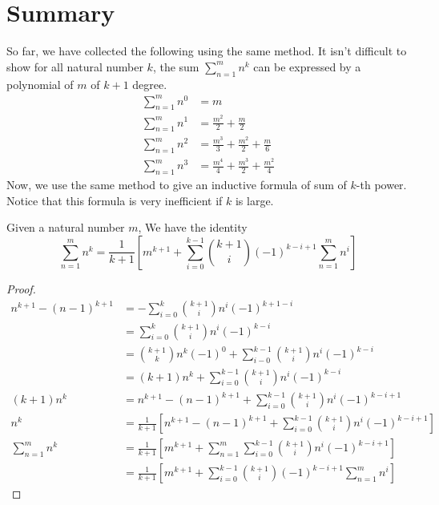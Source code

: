 \documentclass{report}
\begin{document}
\section{Summary}
So far, we have collected the following using the same method. It isn't difficult to show for all natural number $k$, the sum $\sum_{n=1}^{m} n^k$ can be expressed by a polynomial of $m$ of $k+1$ degree.
\begin{align}
  \sum_{n=1}^{m} n^0 &= m\\
  \sum_{n=1}^{m} n^1 &= \frac{m^2}{2}+\frac{m}{2}\\
  \sum_{n=1}^{m} n^2 &= \frac{m^3}{3}+\frac{m^2}{2}+\frac{m}{6}\\
  \sum_{n=1}^{m} n^3 &= \frac{m^4}{4}+\frac{m^3}{2}+\frac{m^2}{4}
\end{align} 
Now, we use the same method to give an inductive formula of sum of $k$-th power. Notice that this formula is very inefficient if $k$ is large.
\begin{theorem}
  Given a natural number $m$, We have the identity 
\begin{equation}
\sum_{n=1}^{m} n^k = \frac{1}{k+1}[m^{k+1}+\sum_{i=0}^{k-1} \binom{k+1}{i}(-1)^{k-i+1}\sum_{n=1}^{m} n^i ]
\end{equation}
\end{theorem}
\begin{proof}
\begin{align}
  n^{k+1}-(n-1)^{k+1}&= -\sum_{i=0}^{k} \binom{k+1}{i}n^i(-1)^{k+1-i}\\
                     &=\sum_{i=0}^{k} \binom{k+1}{i}n^i(-1)^{k-i}\\
                     &= \binom{k+1}{k}n^k(-1)^0+\sum_{i-0}^{k-1} \binom{k+1}{i}n^i(-1)^{k-i}\\
                     &= (k+1)n^k+\sum_{i=0}^{k-1} \binom{k+1}{i}n^i(-1)^{k-i}\\
  (k+1)n^k &= n^{k+1}-(n-1)^{k+1}+\sum_{i=0}^{k-1} \binom{k+1}{i}n^i(-1)^{k-i+1}\\
  n^k &=\frac{1}{k+1}[n^{k+1}-(n-1)^{k+1}+\sum_{i=0}^{k-1} \binom{k+1}{i} n^i(-1)^{k-i+1}]\\
  \sum_{n=1}^{m} n^k&=\frac{1}{k+1}[m^{k+1}+\sum_{n=1}^{m} \sum_{i=0}^{k-1} \binom{k+1}{i}n^i(-1)^{k-i+1}]\\
                    &= \frac{1}{k+1}[m^{k+1}+\sum_{i=0}^{k-1} \binom{k+1}{i}(-1)^{k-i+1}\sum_{n=1}^{m} n^i]
\end{align} 
\end{proof}
\end{document}
